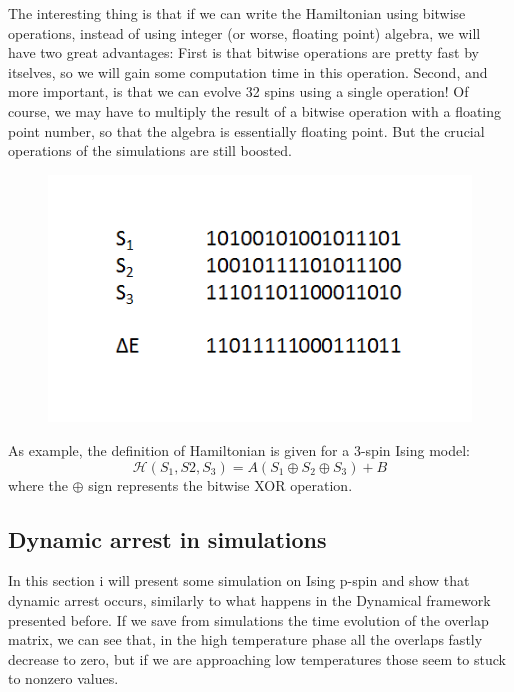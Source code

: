 \documentclass{article}
\begin{document}
The interesting thing is that if we can write the Hamiltonian using bitwise
operations, instead of using integer (or worse, floating point) algebra, we
will have two great advantages: First is that bitwise operations are pretty
fast by itselves, so we will gain some computation time in this operation.
Second, and more important, is that we can evolve 32 spins using a single
operation! Of course, we may have to multiply the result of a bitwise
operation with a floating point number, so that the algebra is essentially
floating point. But the crucial operations of the simulations are still
boosted.


\begin{figure}[scale=0.6]
		\includegraphics{img_multispin.png}
	\label{fig:img_multispin}
	
\end{figure}

As example, the definition of Hamiltonian is given for a 3-spin Ising model:
\begin{equation}
  \mathcal{H} (S_1, S 2, S_3) = A (S_1 \oplus S_2 \oplus S_3) + B
\end{equation}
where the $\oplus$ sign represents the bitwise XOR operation.


\subsection{Dynamic arrest in simulations}

In this section i will present some simulation on Ising p-spin and show that
dynamic arrest occurs, similarly to what happens in the Dynamical framework
presented before. If we save from simulations the time evolution of the overlap matrix, we can see that, 
in the high temperature phase all the overlaps fastly decrease to zero, but if we are approaching low 
temperatures those seem to stuck to nonzero values.
\end{document}

